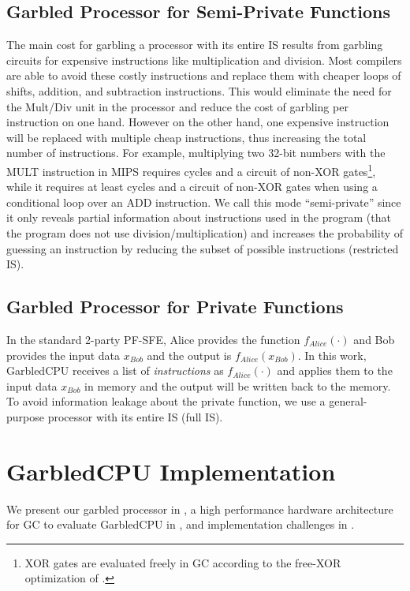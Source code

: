 \subsection{Garbled Processor for Semi-Private Functions}
The main cost for garbling a processor with its entire IS results from garbling circuits for expensive instructions like multiplication and division. Most compilers are able to avoid these costly instructions and replace them with cheaper loops of shifts, addition, and subtraction instructions. This would eliminate the need for the Mult/Div unit in the processor and reduce the cost of garbling per instruction on one hand. However on the other hand, one expensive instruction will be replaced with multiple cheap instructions, thus increasing the total number of instructions. For example, multiplying two 32-bit numbers with the MULT instruction in MIPS requires  cycles and a circuit of  non-XOR gates\footnote{XOR gates are evaluated freely in GC according to the free-XOR optimization of \cite{kolesnikov2008improved}.}, while it requires at least  cycles and a circuit of  non-XOR gates when using a conditional loop over an ADD instruction. We call this mode ``semi-private'' since it only reveals partial information about instructions used in the program (that the program does not use division/multiplication) and increases the probability of guessing an instruction by reducing the subset of possible instructions (restricted IS).

\subsection{Garbled Processor for Private Functions}
In the standard 2-party PF-SFE, Alice provides the function $f_{Alice}(\cdot)$ and Bob provides the input data $x_{Bob}$ and the output is $f_{Alice}(x_{Bob})$. In this work, GarbledCPU receives a list of \emph{instructions} as $f_{Alice}(\cdot)$ and applies them to the input data $x_{Bob}$ in memory and the output will be written back to the memory. To avoid information leakage about the private function, we use a general-purpose processor with its entire IS (full IS).

\section{GarbledCPU Implementation}
We present our garbled processor in , a high performance hardware architecture for GC to evaluate GarbledCPU in , and implementation challenges in .

